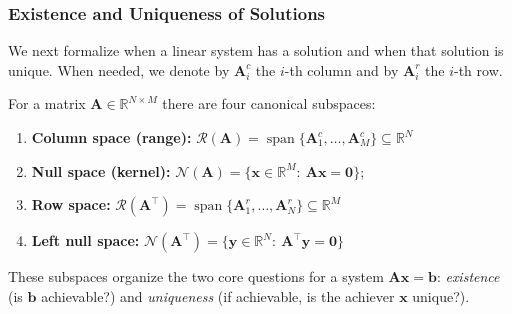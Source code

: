 \subsubsection{Existence and Uniqueness of Solutions}
We next formalize when a linear system has a solution and when that solution is unique. When needed, we denote by $\mathbf{A}_i^c$ the $i$-th column and by $\mathbf{A}_i^r$ the $i$-th row.

For a matrix $\mathbf{A}\in\mathbb{R}^{N\times M}$ there are four canonical subspaces:
\begin{enumerate}
    \item \textbf{Column space (range):} $\displaystyle \mathcal{R}(\mathbf{A})=\operatorname{span}\{\mathbf{A}_1^c,\dots,\mathbf{A}_M^c\}\subseteq\mathbb{R}^N$
    \item \textbf{Null space (kernel):} $\displaystyle \mathcal{N}(\mathbf{A})=\{\mathbf{x}\in\mathbb{R}^M:\ \mathbf{A}\mathbf{x}=\mathbf{0}\}$;
    \item \textbf{Row space:} $\displaystyle \mathcal{R}(\mathbf{A}^{\top})=\operatorname{span}\{\mathbf{A}_1^r,\dots,\mathbf{A}_N^r\}\subseteq\mathbb{R}^M$
    \item \textbf{Left null space:} $\displaystyle \mathcal{N}(\mathbf{A}^{\top})=\{\mathbf{y}\in\mathbb{R}^N:\ \mathbf{A}^{\top}\mathbf{y}=\mathbf{0}\}$
\end{enumerate}
These subspaces organize the two core questions for a system $\mathbf{A}\mathbf{x}=\mathbf{b}$: \emph{existence} (is $\mathbf{b}$ achievable?) and \emph{uniqueness} (if achievable, is the achiever $\mathbf{x}$ unique?). 

